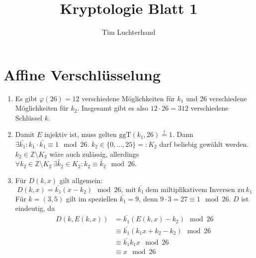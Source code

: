 \documentclass[DIN, pagenumber=false, fontsize=11pt, parskip=half]{scrartcl}
\title{Kryptologie Blatt 1}
\author{Tim Luchterhand}
\newcommand{\Z}[0]{\mathbb{Z}}
\begin{document}
    \maketitle
    \setcounter{section}{1}
    \section{Affine Verschlüsselung}
    \begin{enumerate}
        \item Es gibt $\varphi(26) = 12$ verschiedene Möglichkeiten für $k_1$ und 26 verschiedene Möglichkeiten für $k_2$. Insgesamt
              gibt es also $12 \cdot 26 = 312$ verschiedene Schlüssel $k$.
        \item Damit $E$ injektiv ist, muss gelten $\text{ggT}(k_1, 26) \stackrel{!}{=} 1$. Dann $\exists \bar{k_1} : k_1 \cdot 
              \bar{k_1} \equiv 1 \mod 26$. $k_2 \in \{0, \dots, 25\} =: K_2$ darf beliebig gewählt werden. $k_2 \in \Z \setminus K_2$
              wäre auch zulässig, allerdings $\forall k_2 \in \Z \setminus K_2 \ \exists \tilde{k_2} \in K_2 : k_2 \equiv \tilde{k_2} \mod 26$.
        \item Für $D(k, x)$ gilt allgemein:
              \begin{equation*}
                  D(k, x) = \bar{k_1} (x - k_2) \mod 26, \ \text{mit} \ \bar{k_1} \ \text{dem miltiplikativem Inversen zu} \ k_1
              \end{equation*}
              Für $k = (3, 5)$ gilt im speziellen $\bar{k_1} = 9$, denn $9 \cdot 3 = 27 \equiv 1 \mod 26$.
              $D$ ist eindeutig, da
              \begin{align*}
                  D\left(k, E(k, x)\right) &= \bar{k_1} \left(E(k, x) - k_2\right) \mod 26 \\
                  &\equiv \bar{k_1} \left(k_1 x + k_2 - k_2 \right) \mod 26 \\
                  &\equiv \bar{k_1} k_1 x \mod 26 \\
                  &\equiv x \mod 26
              \end{align*}

    \end{enumerate}
    \newpage
\end{document}
